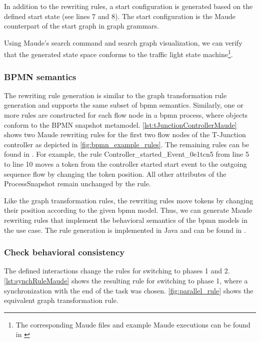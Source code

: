 \documentclass{jot}
\begin{document}
In addition to the rewriting rules, a start configuration is generated based on the defined start state (see lines 7 and 8).
The start configuration is the Maude counterpart of the start graph in graph grammars.



Using Maude's search command and search graph visualization, we can verify that the generated state space conforms to the traffic light state machine\footnote{\label{footnote:maudeArtifacts}The corresponding Maude files and example Maude executions can be found in \cite{krauterArtifactsBehavioralConsistency2022}}.

\subsubsection{BPMN semantics}
The rewriting rule generation is similar to the graph transformation rule generation and supports the same subset of \gls*{bpmn} semantics.
Similarly, one or more rules are constructed for each flow node in a \gls*{bpmn} process, where objects conform to the BPMN snapshot metamodel.
\autoref{lst:tJunctionControllerMaude} shows two Maude rewriting rules for the first two flow nodes of the T-Junction controller as depicted in \autoref{fig:bpmn_example_rules}.
The remaining rules can be found in \cite{krauterArtifactsBehavioralConsistency2022}.
For example, the rule \textsf{Controller\_started\_Event\_0e1tcn5} from line 5 to line 10 moves a token from the controller started start event to the outgoing sequence flow by changing the token position.
All other attributes of the \textsf{ProcessSnapshot} remain unchanged by the rule.



Like the graph transformation rules, the rewriting rules move tokens by changing their position according to the given \gls*{bpmn} model.
Thus, we can generate Maude rewriting rules that implement the behavioral semantics of the \gls*{bpmn} models in the use case.
The rule generation is implemented in Java and can be found in \cite{krauterRewriteRuleGeneration2022}.

\subsubsection{Check behavioral consistency}
The defined interactions change the rules for switching to phases 1 and 2. \autoref{lst:synchRuleMaude} shows the resulting rule for switching to phase 1, where a synchronization with the end of the task was chosen.
\autoref{fig:parallel_rule} shows the equivalent graph transformation rule.
\end{document}
